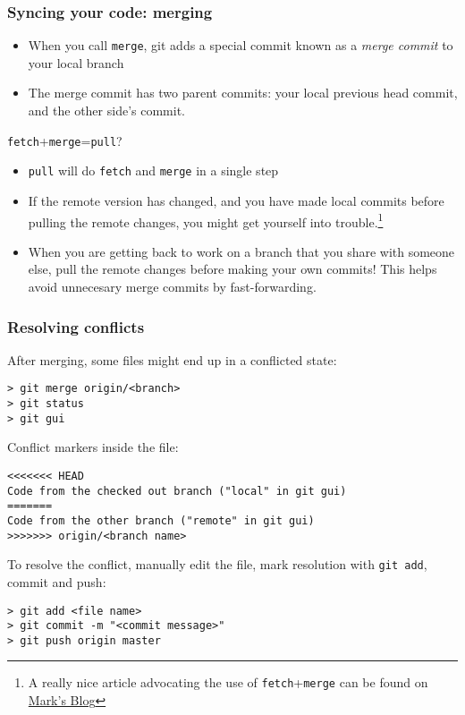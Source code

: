 \begin{frame}[fragile]
	\frametitle{Syncing your code: merging}
	\begin{itemize}
	\item When you call \texttt{merge}, git adds a special commit known as a \textit{merge commit} to your local branch
	\item The merge commit has two parent commits: your local previous head commit, and the other side's commit.
	\end{itemize}
	\begin{block}{\texttt{fetch}+\texttt{merge}=\texttt{pull}?}
	\begin{itemize}	
	\small
	\item \texttt{pull} will do \texttt{fetch} and \texttt{merge} in a single step
	\item If the remote version has changed, and you have made local commits before pulling the remote changes, you might get yourself into trouble.\footnote{A really nice article advocating the use of \texttt{fetch}+\texttt{merge} can be found on \href{http://longair.net/blog/2009/04/16/git-fetch-and-merge/}{Mark's Blog}} 
	\item When you are getting back to work on a branch that you share with someone else, pull the remote changes before making your own commits! This helps avoid unnecesary merge commits by fast-forwarding.
	\end{itemize}
	\end{block}
\end{frame}

\begin{frame}[fragile]
	\frametitle{Resolving conflicts}
	
	After merging, some files might end up in a conflicted state:
	\begin{verbatim}
> git merge origin/<branch>
> git status
> git gui
	\end{verbatim}	
	
	Conflict markers inside the file:
	\begin{verbatim}
<<<<<<< HEAD
Code from the checked out branch ("local" in git gui) 
=======
Code from the other branch ("remote" in git gui)
>>>>>>> origin/<branch name>
	\end{verbatim}

	To resolve the conflict, manually edit the file, mark resolution with \texttt{git add}, commit and push:
	\begin{verbatim}
> git add <file name>
> git commit -m "<commit message>"
> git push origin master
	\end{verbatim}
	
\end{frame}


